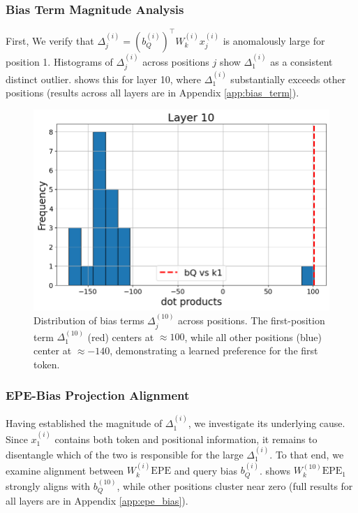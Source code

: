 \documentclass[11pt]{article}
\newif\ifBacklogcomments
\newcommand{\Backlog}[1]{\ifBacklogcomments\textcolor{blue}{[Backlog: #1]}\fi}
\begin{document}
\subsubsection{Bias Term Magnitude Analysis}
\label{sec:delta_analysis}
First, We verify that $\Delta_j^{(i)} = (b_Q^{(i)})^\top W_k^{(i)} x_j^{(i)}$ is anomalously large for position 1. Histograms of $\Delta_j^{(i)}$ across positions $j$ show $\Delta_1^{(i)}$ as a consistent distinct outlier.  shows this for layer 10, where $\Delta_1^{(i)}$ substantially exceeds other positions (results across all layers are in Appendix \ref{app:bias_term}).

\begin{figure}[t]
  \includegraphics[width=\columnwidth]{figures/obs1_layer10.png}
  \caption{Distribution of bias terms $\Delta_j^{(10)}$ across positions. The first-position term $\Delta_1^{(10)}$ (red) centers at $\approx 100$, while all other positions (blue) center at $\approx -140$, demonstrating a learned preference for the first token.}
  \label{fig:obs1_layer10}
\end{figure}

\subsubsection{EPE-Bias Projection Alignment}
\label{sec:epe_alignment}
Having established the magnitude of $\Delta_1^{(i)}$, we investigate its underlying cause. Since $x_1^{(i)}$ contains both token and positional information, it remains to disentangle which of the two is responsible for the large $\Delta_1^{(i)}$. To that end, we examine alignment between $W_k^{(i)}\mathrm{EPE}$ and query bias $b_Q^{(i)}$.  shows $W_k^{(10)}\mathrm{EPE}_1$ strongly aligns with $b_Q^{(10)}$, while other positions cluster near zero (full results for all layers are in Appendix \ref{app:epe_bias}).\Backlog{If we can also do that for $x_1^{(i)}-\mathrm{EPE}_1$ and show that this isn't aligned that would be great for this paragraph (we can put it in the appendix and just write it casually. This is not top priority at all.)}
\end{document}
